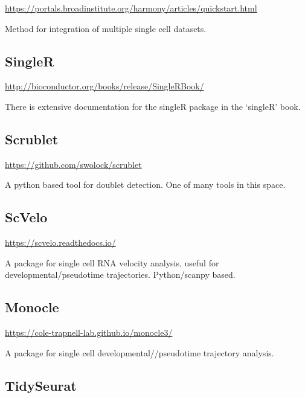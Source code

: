 \documentclass[
]{book}
\begin{document}
\url{https://portals.broadinstitute.org/harmony/articles/quickstart.html}

Method for integration of multiple single cell datasets.

\hypertarget{singler-1}{%
\subsection*{SingleR}\label{singler-1}}

\url{http://bioconductor.org/books/release/SingleRBook/}

There is extensive documentation for the singleR package in the `singleR' book.

\hypertarget{scrublet}{%
\subsection*{Scrublet}\label{scrublet}}

\url{https://github.com/swolock/scrublet}

A python based tool for doublet detection. One of many tools in this space.

\hypertarget{scvelo}{%
\subsection*{ScVelo}\label{scvelo}}

\url{https://scvelo.readthedocs.io/}

A package for single cell RNA velocity analysis, useful for developmental/pseudotime trajectories. Python/scanpy based.

\hypertarget{monocle}{%
\subsection*{Monocle}\label{monocle}}

\url{https://cole-trapnell-lab.github.io/monocle3/}

A package for single cell developmental//pseudotime trajectory analysis.

\hypertarget{tidyseurat}{%
\subsection*{TidySeurat}\label{tidyseurat}}
\end{document}
